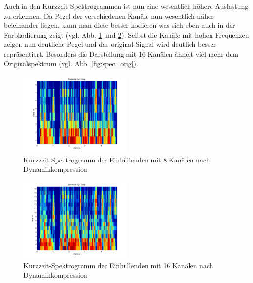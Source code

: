 \documentclass[conference]{IEEEtran}
\begin{document}
\begin{compactenum}[a)]
\newpage
\item Auch in den Kurzzeit-Spektrogrammen ist nun eine wesentlich höhere Auslastung zu erkennen. Da Pegel der verschiedenen Kanäle nun wesentlich näher beieinander liegen, kann man diese besser kodieren was sich eben auch in der Farbkodierung zeigt (vgl. Abb. \ref{fig:spec_dyn8} und \ref{fig:spec_dyn16}). Selbst die Kanäle mit hohen Frequenzen zeigen nun deutliche Pegel und das original Signal wird deutlich besser repräsentiert. Besonders die Darstellung mit 16 Kanälen ähnelt viel mehr dem Originalspektrum (vgl. Abb. \ref{fig:spec_orig}).
\begin{figure}
	\vspace{-5pt}
	\centering
	\includegraphics[width=0.5\textwidth]{img/spec_dyn8.png}
	\vspace{-10pt}
	\caption{Kurzzeit-Spektrogramm der Einhüllenden mit 8 Kanälen nach Dynamikkompression}
	\vspace{-10pt}
	\label{fig:spec_dyn8}
\end{figure}

\begin{figure}
	\vspace{-5pt}
	\centering
	\includegraphics[width=0.5\textwidth]{img/spec_dyn16.png}
	\vspace{-10pt}
	\caption{Kurzzeit-Spektrogramm der Einhüllenden mit 16 Kanälen nach Dynamikkompression}
	\vspace{-10pt}
	\label{fig:spec_dyn16}
\end{figure}


\end{compactenum}
\end{document}
